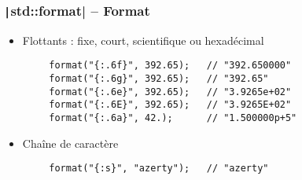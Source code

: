 \documentclass[C++.tex]{subfiles}
\begin{document}
\begin{frame}[fragile]
	\frametitle{\texttt|std::format| -- Format}
	\begin{itemize}
		\item Flottants : fixe, court, scientifique ou hexadécimal
	\end{itemize}

	\begin{verbatim}
		format("{:.6f}", 392.65);   // "392.650000"
		format("{:.6g}", 392.65);   // "392.65"
		format("{:.6e}", 392.65);   // "3.9265e+02"
		format("{:.6E}", 392.65);   // "3.9265E+02"
		format("{:.6a}", 42.);      // "1.500000p+5"
	\end{verbatim}


	\begin{itemize}
		\item Chaîne de caractère
	\end{itemize}

	\begin{verbatim}
		format("{:s}", "azerty");   // "azerty"
	\end{verbatim}
\end{frame}
\end{document}
